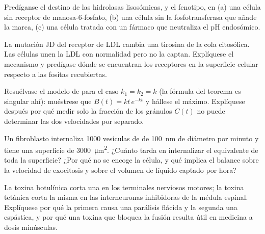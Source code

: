 \begin{exercise}[$\star\star$]\label{exo:b3:membrane-traffic:8}
Predíganse el destino de las hidrolasas lisosómicas, y el fenotipo, en
(a) una célula sin receptor de manosa-6-fosfato, (b) una célula sin la
fosfotransferasa que añade la marca, (c) una célula tratada con un
fármaco que neutraliza el pH endosómico.
\end{exercise}

\begin{exercise}[$\star\star$]\label{exo:b3:membrane-traffic:9}
La mutación JD del receptor de LDL cambia una tirosina de la cola
citosólica. Las células unen la LDL con normalidad pero no la captan.
Explíquese el mecanismo y predígase dónde se encuentran los receptores en
la superficie celular respecto a las fositas recubiertas.
\end{exercise}

\begin{exercise}[$\star\star\star$]\label{exo:b3:membrane-traffic:10}
Resuélvase el modelo de  para el caso $k_{1} = k_{2} = k$ (la
fórmula del teorema es singular ahí): muéstrese que
$B(t) = kt\,e^{-kt}$ y hállese el máximo. Explíquese después por qué
medir solo la fracción de los gránulos $C(t)$ no puede determinar las dos
velocidades por separado.
\end{exercise}

\begin{exercise}[$\star\star\star$]\label{exo:b3:membrane-traffic:11}
Un fibroblasto internaliza \num{1000} vesículas de  de
\qty{100}{nm} de diámetro por minuto y tiene una superficie de
\qty{3000}{\micro m^2}. ¿Cuánto tarda en internalizar el equivalente de
toda la superficie? ¿Por qué no se encoge la célula, y qué implica el
balance sobre la velocidad de exocitosis y sobre el volumen de líquido
captado por hora?
\end{exercise}

\begin{exercise}[$\star\star\star$]\label{exo:b3:membrane-traffic:12}
La toxina botulínica corta una  en los terminales nerviosos
motores; la toxina tetánica corta la misma  en las interneuronas
inhibidoras de la médula espinal. Explíquese por qué la primera causa una
parálisis flácida y la segunda una espástica, y por qué una toxina que
bloquea la fusión resulta útil en medicina a dosis minúsculas.
\end{exercise}

